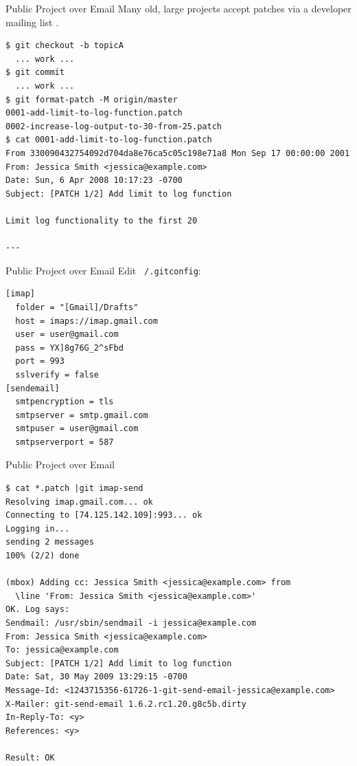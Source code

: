 \documentclass[12pt]{beamer}
\begin{document}
\begin{frame}[fragile]{Public Project over Email}
Many old, large projects accept patches via a developer mailing list \cite{gitbook}.
    \begin{verbatim}
$ git checkout -b topicA
  ... work ...
$ git commit
  ... work ...
$ git format-patch -M origin/master
0001-add-limit-to-log-function.patch
0002-increase-log-output-to-30-from-25.patch
$ cat 0001-add-limit-to-log-function.patch
From 330090432754092d704da8e76ca5c05c198e71a8 Mon Sep 17 00:00:00 2001
From: Jessica Smith <jessica@example.com>
Date: Sun, 6 Apr 2008 10:17:23 -0700
Subject: [PATCH 1/2] Add limit to log function

Limit log functionality to the first 20

---
    \end{verbatim}
\end{frame}

\begin{frame}[fragile]{Public Project over Email}
    Edit \texttt{~/.gitconfig}:
    \begin{verbatim}
[imap]
  folder = "[Gmail]/Drafts"
  host = imaps://imap.gmail.com
  user = user@gmail.com
  pass = YX]8g76G_2^sFbd
  port = 993
  sslverify = false
[sendemail]
  smtpencryption = tls
  smtpserver = smtp.gmail.com
  smtpuser = user@gmail.com
  smtpserverport = 587
    \end{verbatim}
\end{frame}

\begin{frame}[fragile]{Public Project over Email}
    \begin{verbatim}
$ cat *.patch |git imap-send
Resolving imap.gmail.com... ok
Connecting to [74.125.142.109]:993... ok
Logging in...
sending 2 messages
100% (2/2) done

(mbox) Adding cc: Jessica Smith <jessica@example.com> from
  \line 'From: Jessica Smith <jessica@example.com>'
OK. Log says:
Sendmail: /usr/sbin/sendmail -i jessica@example.com
From: Jessica Smith <jessica@example.com>
To: jessica@example.com
Subject: [PATCH 1/2] Add limit to log function
Date: Sat, 30 May 2009 13:29:15 -0700
Message-Id: <1243715356-61726-1-git-send-email-jessica@example.com>
X-Mailer: git-send-email 1.6.2.rc1.20.g8c5b.dirty
In-Reply-To: <y>
References: <y>

Result: OK
    \end{verbatim}
\end{frame}
\end{document}
